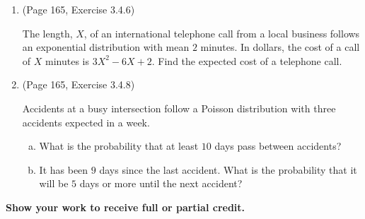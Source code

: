 \documentclass[12pt]{article}
\begin{document}
\begin{enumerate}
    The \textit{median} of a probability distribution is the value that is exceeded $1/2$ of the time.
    \begin{enumerate}[(a)]
      \item Find the median of an exponential distribution with mean $\beta$.
      \item Find the probability an observation exceeds $\beta$.
    \end{enumerate}

  \newpage
  \item (Page 165, Exercise 3.4.6)

    The length, $X$, of an international telephone call from a local business follows an exponential distribution with mean $2$ minutes. In dollars, the cost of a call of $X$ minutes is $3X^2 - 6X + 2$. Find the expected cost of a telephone call.

  \newpage
  \item (Page 165, Exercise 3.4.8)

    Accidents at a busy intersection follow a Poisson distribution with three accidents expected in a week.
    \begin{enumerate}[(a)]
      \item What is the probability that at least $10$ days pass between accidents?
      \item It has been $9$ days since the last accident. What is the probability that it will be $5$ days or more until the next accident?
    \end{enumerate}
\end{enumerate}

\begin{center}
  \textbf{\large Show your work to receive full or partial credit.}
\end{center}
\end{document}
